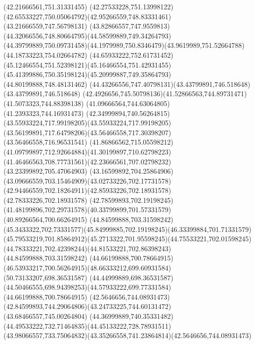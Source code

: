{{	\lineto(42.21666561,751.31331455)
	\lineto(42.27533228,751.13998122)
	\curveto(42.65533227,750.05064792)(42.95266559,748.83331461)(43.21666559,747.56798131)
	\curveto(43.82866557,747.9559813)(44.32066556,748.80664795)(44.58599889,749.34264793)
	\curveto(44.39799889,750.09731458)(44.1979989,750.8346479)(43.9619989,751.52664788)
	\lineto(44.18733223,754.02664782)
	\curveto(44.65933222,752.61731452)(45.12466554,751.52398121)(45.16466554,751.42931455)
	\curveto(45.41399886,750.35198124)(45.20999887,749.35864793)(44.80199888,748.48131462)
	\curveto(44.43266556,747.40798131)(43.43799891,746.518648)(43.43799891,746.518648)
	\curveto(42.4926656,745.50798136)(41.52866563,744.89731471)(41.5073323,744.88398138)
	\lineto(41.09666564,744.63064805)
	\lineto(41.2393323,744.16931473)
	\curveto(42.34999894,740.56264815)(43.55933224,717.99198205)(43.55933224,717.99198205)
	\curveto(43.56199891,717.64798206)(43.56466558,717.30398207)(43.56466558,716.96531541)
	\curveto(41.86866562,715.05598212)(41.09799897,712.92664884)(41.30199897,710.62798223)
	\curveto(41.46466563,708.77731561)(42.23666561,707.02798232)(43.23399892,705.47064903)
	\curveto(43.16599892,704.25864906)(43.09666559,703.15464909)(43.02733226,702.17731578)
	\curveto(42.94466559,702.18264911)(42.85933226,702.18931578)(42.78333226,702.18931578)
	\lineto(42.78599893,702.19198245)
	\curveto(41.48199896,702.29731578)(40.33799899,701.57331579)(40.89266564,700.66264915)
	\moveto(44.84599888,703.31598242)
	\curveto(45.3433322,702.73331577)(45.84999885,702.19198245)(46.33399884,701.71331579)
	\curveto(45.79533219,701.85864912)(45.2713322,701.95598245)(44.75533221,702.01598245)
	\curveto(44.78333221,702.42398244)(44.81533221,702.86398243)(44.84599888,703.31598242)
	\moveto(44.66199888,700.78664915)
	\curveto(46.53933217,700.56264915)(48.66333212,699.60931584)(50.73133207,698.36531587)
	\lineto(44.44999889,698.36531587)
	\curveto(44.50466555,698.94398253)(44.57933222,699.77331584)(44.66199888,700.78664915)
	\moveto(42.5646656,744.08931473)
	\curveto(42.84599893,744.29064806)(43.24733225,744.60131472)(43.68466557,745.00264804)
	\curveto(44.36999889,740.35331482)(44.49533222,732.71464835)(44.45133222,728.78931511)
	\curveto(43.98066557,733.75064832)(43.35266558,741.23864814)(42.5646656,744.08931473)
}
}
